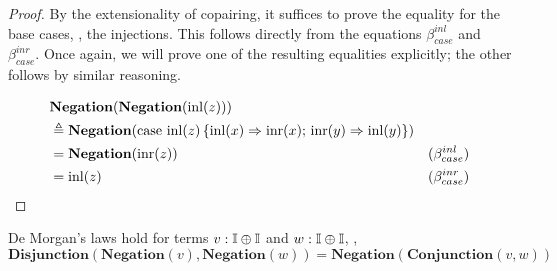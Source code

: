 \begin{proof}
  By the extensionality of copairing, it suffices to prove the equality for the base cases, \ie, the injections. This follows directly from the equations \(\beta_{case}^{inl}\) and \(\beta_{case}^{inr}\). Once again, we will prove one of the resulting equalities explicitly; the other follows by similar reasoning.
  
    \begin{equation*}
    \begin{split}
       &\textbf{Negation} (\textbf{Negation} (\mathrm{inl}(z)) )  \\
        & \triangleq   \textbf{Negation} ( \text{case } \mathrm{inl}(z) \,
    \{\mathrm{inl}(x) 
        \Rightarrow \mathrm{inr}(x) ; \,
      \mathrm{inr}(y) \Rightarrow \mathrm{inl}(y)
    \}) \\
    & = \textbf{Negation}(\mathrm{inr}(z)) & (\beta_{case}^{inl}) \\
    & = \mathrm{inl}(z) & (\beta_{case}^{inr})
    \end{split} 
    \end{equation*}
\end{proof}

\begin{lemma} \label{lem:dmorgan} 
  De Morgan's laws hold for terms  $v: \mathbb{I} \oplus \mathbb{I}$ and $w: \mathbb{I} \oplus \mathbb{I}$, \ie, 
  $$\textbf{Disjunction} (\textbf{Negation} (v) , \textbf{Negation} (w)) =  \textbf{Negation}(\textbf{Conjunction} (v, w)) $$ 
\end{lemma}

